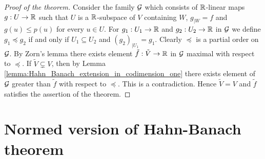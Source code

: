 \begin{proof}[Proof of the theorem]
Consider the family ${\mathcal G}$ which consists of ${\mathbb R}$-linear maps $g:U\rightarrow {\mathbb R}$ such that $U$ is a ${\mathbb R}$-subspace of $V$ containing $W$, $g_{\mid W} = f$ and $g(u) \leq p(u)$ for every $u\in U$. For $g_1:U_1\rightarrow {\mathbb R}$ and $g_2:U_2\rightarrow {\mathbb R}$ in ${\mathcal G}$ we define $g_1\preceq g_2$ if and only if $U_1\subseteq U_2$ and $\left(g_2\right)_{\mid U_1} = g_1$. Clearly $\preceq$ is a partial order on ${\mathcal G}$. By Zorn's lemma there exists element $\tilde{f}:\tilde{V}\rightarrow {\mathbb R}$ in ${\mathcal G}$ maximal with respect to $\preceq$. If $\tilde{V}\subsetneq V$, then by Lemma \ref{lemma:Hahn_Banach_extension_in_codimension_one} there exists element of ${\mathcal G}$ greater than $\tilde{f}$ with respect to $\preceq$. This is a contradiction. Hence $\tilde{V} = V$ and $\tilde{f}$ satisfies the assertion of the theorem.
\end{proof}

\section{Normed version of Hahn-Banach theorem}










